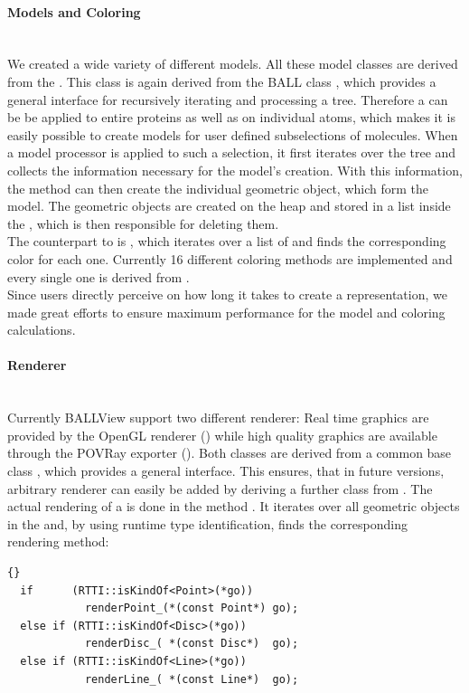 \paragraph{Models and Coloring}
\hspace*{\fill}\\
We created a wide variety of different models.
All these model classes are derived from the .
This class is again derived from the BALL class , 
which provides a general interface for recursively iterating and processing a 
 tree.
Therefore a  can be be applied to entire proteins as well as on 
individual atoms, which makes it is easily possible to create models for user defined 
subselections of molecules.
When a model processor is applied to such a selection, it first iterates over the
 tree and collects the information necessary for the model's creation.
With this information, the method  can then create the 
individual geometric object, which form the model. 
The geometric objects are created on the heap and stored in a list inside the 
, which is then responsible for deleting them.
\\
The counterpart to  is , which iterates over a 
list of  and finds the corresponding color for each one.
Currently 16 different coloring methods are implemented and
every single one is derived from .
\\
Since users directly perceive on how long it takes to create a representation,
we made great efforts to ensure maximum performance for the model and coloring 
calculations.

\paragraph{Renderer}\label{renderer}
\hspace*{\fill}\\
Currently BALLView support two different renderer: Real time graphics are provided by the
OpenGL renderer () while high quality graphics are available through the 
POVRay exporter ().
Both classes are derived from a common base class , which provides a general 
interface.
This ensures, that in future versions, arbitrary renderer can easily be added by
deriving a further class from .
The actual rendering of a  is done in the method
.
It iterates over all geometric objects in the  and,
by using runtime type identification, finds the corresponding rendering method:
\begin{lstlisting}{}
  if      (RTTI::isKindOf<Point>(*go))
            renderPoint_(*(const Point*) go);
  else if (RTTI::isKindOf<Disc>(*go))
            renderDisc_( *(const Disc*)  go);
  else if (RTTI::isKindOf<Line>(*go))
            renderLine_( *(const Line*)  go);
\end{lstlisting}
 

